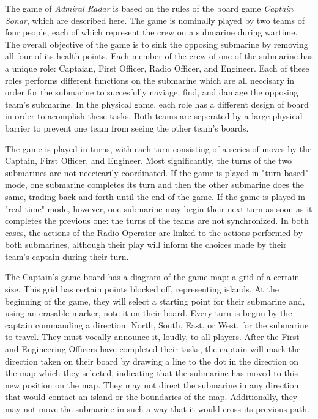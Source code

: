 The game of \textit{Admiral Radar} is based on the rules of the board game \textit{Captain Sonar}, which are described here. The game is nominally played by two teams of four people, each of which represent the crew on a submarine during wartime. The overall objective of the game is to sink the opposing submarine by removing all four of its health points. Each member of the crew of one of the submarine has a unique role: Captaian, First Officer, Radio Officer, and Engineer. Each of these roles performs different functions on the submarine which are all neccisary in order for the submarine to succesfully naviage, find, and damage the opposing team's submarine. In the physical game, each role has a different design of board in order to acomplish these tasks. Both teams are seperated by a large physical barrier to prevent one team from seeing the other team's boards.

The game is played in turns, with each turn consisting of a series of moves by the Captain, First Officer, and Engineer. Most significantly, the turns of the two submarines are not neccicarily coordinated. If the game is played in "turn-based" mode, one submarine completes its turn and then the other submarine does the same, trading back and forth until the end of the game. If the game is played in "real time" mode, however, one submarine may begin their next turn as soon as it completes the previous one: the turns of the teams are not synchronized. In both cases, the actions of the Radio Operator are linked to the actions performed by both submarines, although their play will inform the choices made by their team's captain during their turn. 

The Captain's game board has a diagram of the game map: a grid of a certain size. This grid has certain points blocked off, representing islands. At the beginning of the game, they will select a starting point for their submarine and, using an erasable marker, note it on their board. Every turn is begun by the captain commanding a direction: North, South, East, or West, for the submarine to travel. They must vocally announce it, loudly, to all players. After the First and Engineering Officers have completed their tasks, the captain will mark the direction taken on their board by drawing a line to the dot in the direction on the map which they selected, indicating that the submarine has moved to this new position on the map. They may not direct the submarine in any direction that would contact an island or the boundaries of the map. Additionally, they may not move the submarine in such a way that it would cross its previous path.

